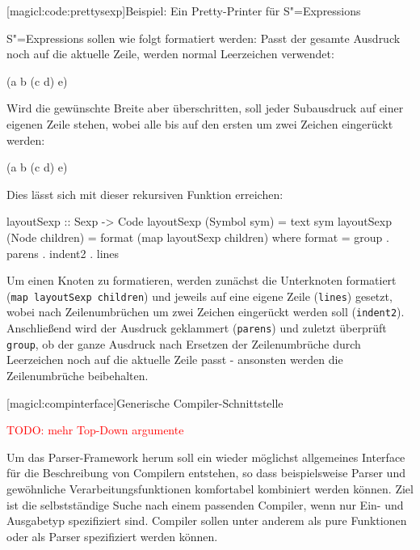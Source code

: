 \documentclass[12pt, a4paper, bibgerm]{scrbook}
\newenvironment{DIFnomarkup}{}{}
\newcommand\icode[1]{\lstinline?#1?}
\newcommand{\todo}[1]{
  \textcolor{red}{TODO: #1}
}
\newcommand\lsection{}
\newcommand\lsubsection{}
\newcommand{\sexps}{S"=Expressions}
\begin{document}
\lsubsection[magicl:code:prettysexp]{Beispiel: Ein Pretty-Printer für \sexps{}}

\sexps{} sollen wie folgt formatiert werden: Passt der gesamte Ausdruck
noch auf die aktuelle Zeile, werden normal Leerzeichen verwendet:
\begin{DIFnomarkup}\begin{code}
(a b (c d) e)
\end{code}\end{DIFnomarkup}
Wird die gewünschte Breite aber überschritten, soll jeder Subausdruck
auf einer eigenen Zeile stehen, wobei alle bis auf den ersten um zwei
Zeichen eingerückt werden:
\begin{DIFnomarkup}\begin{code}
(a
  b
  (c d)
  e)
\end{code}\end{DIFnomarkup}
Dies lässt sich mit dieser rekursiven Funktion erreichen:
\begin{DIFnomarkup}\begin{code}
layoutSexp :: Sexp -> Code
layoutSexp (Symbol sym)    = text sym
layoutSexp (Node children) = format (map layoutSexp children)
  where format = group . parens . indent2 . lines
\end{code}\end{DIFnomarkup} %

Um einen Knoten zu formatieren, werden zunächst die Unterknoten
formatiert \\ (\icode{map layoutSexp children}) und jeweils auf eine eigene
Zeile (\icode{lines}) gesetzt, wobei nach Zeilenumbrüchen um zwei
Zeichen eingerückt werden soll (\icode{indent2}). Anschließend wird
der Ausdruck geklammert (\icode{parens}) und zuletzt überprüft
\icode{group}, ob der ganze Ausdruck nach Ersetzen der Zeilenumbrüche
durch Leerzeichen noch auf die aktuelle Zeile passt - ansonsten werden
die Zeilenumbrüche beibehalten.

\lsection[magicl:compinterface]{Generische Compiler-Schnittstelle}

\todo{mehr Top-Down argumente}

Um das Parser-Framework herum soll ein wieder möglichst allgemeines
Interface für die Beschreibung von Compilern entstehen, so dass
beispielsweise Parser und gewöhnliche Verarbeitungsfunktionen
komfortabel kombiniert werden können. Ziel ist die selbstständige Suche
nach einem passenden Compiler, wenn nur Ein- und Ausgabetyp spezifiziert
sind. Compiler sollen unter anderem als pure Funktionen oder als Parser
spezifiziert werden können.
\end{document}
